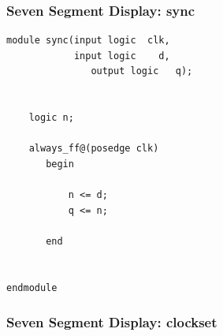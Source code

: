 \documentclass[a4paper]{article}
\begin{document}
\subsubsection{Seven Segment Display: sync}
\begin{Verbatim}
module sync(input logic  clk,
            input logic    d,
			   output logic   q);


	logic n;
	
	always_ff@(posedge clk) 
	   begin
	   
		   n <= d;
		   q <= n;
		
	   end
	   

endmodule 
\end{Verbatim}

\subsubsection{Seven Segment Display: clockset}
\end{document}
